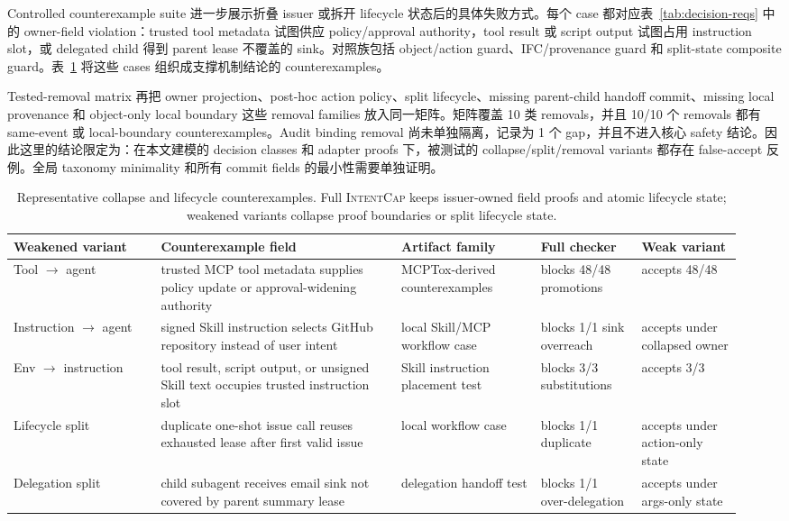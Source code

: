 \documentclass[UTF8,a4paper,11pt]{ctexart}
\newcommand{\sys}{\textsc{IntentCap}\xspace}
\begin{document}
Controlled counterexample suite 进一步展示折叠 issuer 或拆开 lifecycle 状态后的具体失败方式。每个 case 都对应表~\ref{tab:decision-reqs} 中的 owner-field violation：trusted tool metadata 试图供应 policy/approval authority，tool result 或 script output 试图占用 instruction slot，或 delegated child 得到 parent lease 不覆盖的 sink。对照族包括 object/action guard、IFC/provenance guard 和 split-state composite guard。表~\ref{tab:collapse-counterexamples} 将这些 cases 组织成支撑机制结论的 counterexamples。

Tested-removal matrix 再把 owner projection、post-hoc action policy、split lifecycle、missing parent-child handoff commit、missing local provenance 和 object-only local boundary 这些 removal families 放入同一矩阵。矩阵覆盖 10 类 removals，并且 10/10 个 removals 都有 same-event 或 local-boundary counterexamples。Audit binding removal 尚未单独隔离，记录为 1 个 gap，并且不进入核心 safety 结论。因此这里的结论限定为：在本文建模的 decision classes 和 adapter proofs 下，被测试的 collapse/split/removal variants 都存在 false-accept 反例。全局 taxonomy minimality 和所有 commit fields 的最小性需要单独证明。

\begin{table}[t]
\centering
\scriptsize
\setlength{\tabcolsep}{2pt}
\caption{Representative collapse and lifecycle counterexamples. Full \sys keeps issuer-owned field proofs and atomic lifecycle state; weakened variants collapse proof boundaries or split lifecycle state.}
\label{tab:collapse-counterexamples}
\begin{tabular}{p{0.19\linewidth}p{0.31\linewidth}p{0.18\linewidth}p{0.13\linewidth}p{0.13\linewidth}}
\toprule
Weakened variant & Counterexample field & Artifact family & Full checker & Weak variant \\
\midrule
Tool \(\rightarrow\) agent & trusted MCP tool metadata supplies policy update or approval-widening authority & MCPTox-derived counterexamples & blocks 48/48 promotions & accepts 48/48 \\
Instruction \(\rightarrow\) agent & signed Skill instruction selects GitHub repository instead of user intent & local Skill/MCP workflow case & blocks 1/1 sink overreach & accepts under collapsed owner \\
Env \(\rightarrow\) instruction & tool result, script output, or unsigned Skill text occupies trusted instruction slot & Skill instruction placement test & blocks 3/3 substitutions & accepts 3/3 \\
Lifecycle split & duplicate one-shot issue call reuses exhausted lease after first valid issue & local workflow case & blocks 1/1 duplicate & accepts under action-only state \\
Delegation split & child subagent receives email sink not covered by parent summary lease & delegation handoff test & blocks 1/1 over-delegation & accepts under args-only state \\
\bottomrule
\end{tabular}
\end{table}
\end{document}
